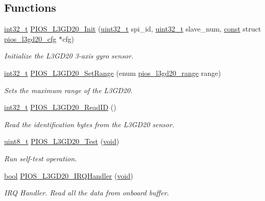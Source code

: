 \subsection*{Functions}
\begin{DoxyCompactItemize}
\item 
\hyperlink{group___n_a_m_e_gafd12020da5a235dfcf0c3c748fb5baed}{int32\-\_\-t} \hyperlink{group___p_i_o_s___l3_g_d20_gac5608ef1d6d1c639969449e9613ed814}{P\-I\-O\-S\-\_\-\-L3\-G\-D20\-\_\-\-Init} (\hyperlink{stdint_8h_a435d1572bf3f880d55459d9805097f62}{uint32\-\_\-t} spi\-\_\-id, \hyperlink{stdint_8h_a435d1572bf3f880d55459d9805097f62}{uint32\-\_\-t} slave\-\_\-num, \hyperlink{group___n_a_m_e_ga7ae6d0e43244213b34de2c2b9aa30da6}{const} struct \hyperlink{structpios__l3gd20__cfg}{pios\-\_\-l3gd20\-\_\-cfg} $\ast$cfg)
\begin{DoxyCompactList}\small\item\em Initialize the L3\-G\-D20 3-\/axis gyro sensor. \end{DoxyCompactList}\item 
\hyperlink{group___n_a_m_e_gafd12020da5a235dfcf0c3c748fb5baed}{int32\-\_\-t} \hyperlink{group___p_i_o_s___l3_g_d20_ga26819f3aff62932a133ff618c3f25ee3}{P\-I\-O\-S\-\_\-\-L3\-G\-D20\-\_\-\-Set\-Range} (enum \hyperlink{group___p_i_o_s___l3_g_d20_ga704696d385abb591516d2e31301dad66}{pios\-\_\-l3gd20\-\_\-range} range)
\begin{DoxyCompactList}\small\item\em Sets the maximum range of the L3\-G\-D20. \end{DoxyCompactList}\item 
\hyperlink{group___n_a_m_e_gafd12020da5a235dfcf0c3c748fb5baed}{int32\-\_\-t} \hyperlink{group___p_i_o_s___l3_g_d20_gacbb45ecd0888306f970c7a719cb372c2}{P\-I\-O\-S\-\_\-\-L3\-G\-D20\-\_\-\-Read\-I\-D} ()
\begin{DoxyCompactList}\small\item\em Read the identification bytes from the L3\-G\-D20 sensor. \end{DoxyCompactList}\item 
\hyperlink{stdint_8h_aba7bc1797add20fe3efdf37ced1182c5}{uint8\-\_\-t} \hyperlink{group___p_i_o_s___l3_g_d20_ga9951dd9f920e6734bbce9117a983fed5}{P\-I\-O\-S\-\_\-\-L3\-G\-D20\-\_\-\-Test} (\hyperlink{group___n_a_m_e_ga18028b8badbf1ea7e704ccac3c488e82}{void})
\begin{DoxyCompactList}\small\item\em Run self-\/test operation. \end{DoxyCompactList}\item 
\hyperlink{group___exported__types_gaf6a258d8f3ee5206d682d799316314b1}{bool} \hyperlink{group___p_i_o_s___l3_g_d20_ga27629f4a3a69cd7202e7effff4d9a2d2}{P\-I\-O\-S\-\_\-\-L3\-G\-D20\-\_\-\-I\-R\-Q\-Handler} (\hyperlink{group___n_a_m_e_ga18028b8badbf1ea7e704ccac3c488e82}{void})
\begin{DoxyCompactList}\small\item\em I\-R\-Q Handler. Read all the data from onboard buffer. \end{DoxyCompactList}\end{DoxyCompactItemize}


